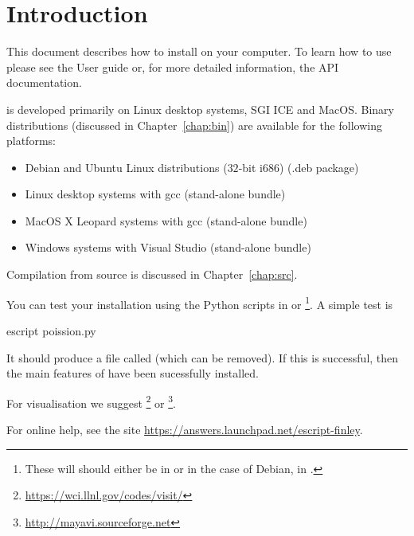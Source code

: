 

%
%
%

\chapter*{Introduction}
This document describes how to install \esfinley on your computer.
To learn how to use \esfinley please see the User guide or, for
more detailed information, the API documentation.

\esfinley is developed primarily on Linux desktop systems,  SGI ICE and MacOS.
Binary distributions (discussed in Chapter~\ref{chap:bin}) are available for the following platforms:
\begin{itemize}
\item Debian and Ubuntu Linux distributions ($32$-bit i686) (.deb package)
\item Linux desktop systems with gcc (stand-alone bundle)
\item MacOS X Leopard systems with gcc (stand-alone bundle)
\item Windows systems with Visual Studio (stand-alone bundle) 
\end{itemize}

Compilation from source is discussed in Chapter~\ref{chap:src}.

You can test your installation using the Python scripts in  or 
\footnote{These will should either be in  or in the case of Debian, in .}.
A simple test is
\begin{shellCode}
 escript poission.py
\end{shellCode}
It should produce a file called  (which can be removed).
If this is successful, then the main features of \escript have been sucessfully installed.

For visualisation we suggest \footnote{\url{https://wci.llnl.gov/codes/visit/}} or \footnote{\url{http://mayavi.sourceforge.net}}.

For online help, see the site \url{https://answers.launchpad.net/escript-finley}.